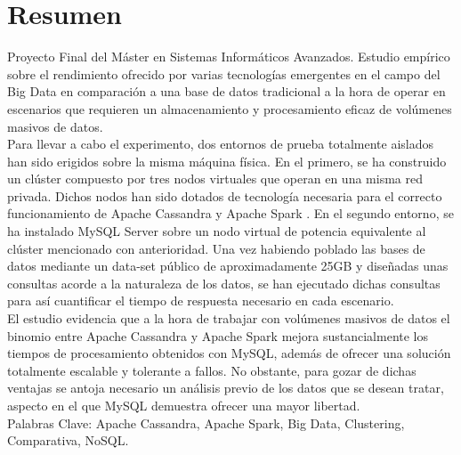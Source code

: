 \section*{Resumen}

Proyecto Final del Máster en Sistemas Informáticos Avanzados. Estudio empírico sobre el rendimiento ofrecido por varias tecnologías emergentes en el campo del Big Data en comparación a una base de datos tradicional a la hora de operar en escenarios que requieren un almacenamiento y procesamiento eficaz de volúmenes masivos de datos.\\

Para llevar a cabo el experimento, dos entornos de prueba totalmente aislados han sido erigidos sobre la misma máquina física. En el primero, se ha construido un clúster compuesto por tres nodos virtuales que operan en una misma red privada. Dichos nodos han sido dotados de tecnología necesaria para el correcto funcionamiento de Apache Cassandra \cite{lakshman2010cassandra} y Apache Spark \cite{zaharia2010spark}. En el segundo entorno, se ha instalado MySQL Server sobre un nodo virtual de potencia equivalente al clúster mencionado con anterioridad. Una vez habiendo poblado las bases de datos mediante un data-set público de aproximadamente 25GB y diseñadas unas consultas acorde a la naturaleza de los datos, se han ejecutado dichas consultas para así cuantificar el tiempo de respuesta necesario en cada escenario.\\

El estudio evidencia que a la hora de trabajar con volúmenes masivos de datos el binomio entre Apache Cassandra y Apache Spark mejora sustancialmente los tiempos de procesamiento obtenidos con MySQL, además de ofrecer una solución totalmente escalable y tolerante a fallos. No obstante, para gozar de dichas ventajas  se antoja necesario un análisis previo de los datos que se desean tratar, aspecto en el que MySQL demuestra ofrecer una mayor libertad.\\


Palabras Clave: Apache Cassandra, Apache Spark, Big Data, Clustering, Comparativa, NoSQL.\\
